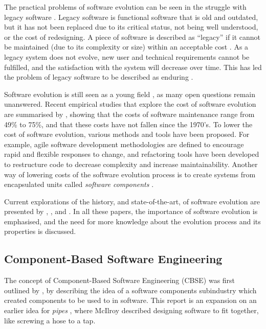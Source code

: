 The practical problems of software evolution can be seen in the struggle with legacy software \citep{Bennett1995}.
Legacy software is functional software that is old and outdated, but it has not been replaced due to its critical status, not being well understood, or the cost of redesigning.
A piece of software is described as ``legacy'' if it cannot be maintained  (due to its complexity or size) within an acceptable cost \citep{Bisbal1999}.
As a legacy system does not evolve, new user and technical requirements cannot be fulfilled, and the satisfaction with the system will decrease over time.
This has led the problem of legacy software to be described as enduring \citep{Bennett2000}. 

Software evolution is still seen as a young field \citep{Godfrey2008}, as many open questions remain unanswered.
Recent empirical studies that explore the cost of software evolution are summarised by \cite{Grubb2003}, 
showing that the costs of software maintenance range from 49\% to 75\%, and that these costs have not fallen since the 1970's. 
To lower the cost of software evolution, various methods and tools have been proposed.
For example, agile software development methodologies \citep{beck2001manifesto} are defined to encourage rapid and flexible responses to change,
and refactoring tools \citep{fowler1999refactoring} have been developed to restructure code to decrease complexity and increase maintainability. 
Another way of lowering costs of the software evolution process is to create systems from encapsulated units called \textit{software components} \citep{Szyperski2002}.

Current explorations of the history, and state-of-the-art, of software evolution are presented by \cite{Bennett2000}, \cite{Lehman2003}, and \cite{Godfrey2008}.
In all these papers, the importance of software evolution is emphasised, and the need for more knowledge about the evolution process and its properties is discussed.

\subsection{Component-Based Software Engineering}
\label{back.CBSE}
The concept of Component-Based Software Engineering (CBSE) was first outlined by \cite{McIlroy1969}, 
by describing the idea of a software components subindustry which created components to be used to in software.
This report is an expansion on an earlier idea for \textit{pipes} \citep{mcilroy1964pipes}, 
where McIlroy described designing software to fit together, like screwing a hose to a tap.

